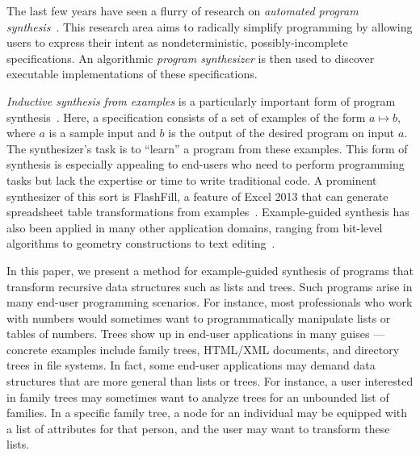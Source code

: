 The last few years have seen a flurry of research on {\em automated
  program
  synthesis}~\cite{sketch06,completefunctional,gulwani-dimensions,sygus,VechevYY13}. This
research area aims to radically simplify programming by allowing
users to express their intent as nondeterministic,
possibly-incomplete specifications.  An algorithmic {\em program
  synthesizer} is then used to discover executable implementations of
these specifications.

{\em Inductive synthesis from
  examples} is a
particularly important form of program synthesis~\cite{gulwani-string,lieberman2001your,kitzelmann2}. Here, a
specification consists of a set of examples of the form $a \mapsto b$,
where $a$ is a sample input and $b$ is the output of the desired
program on input $a$.  The synthesizer's task is to ``learn'' a
program from these examples. This form of synthesis is especially
appealing to end-users who need to perform programming tasks but lack
the expertise or time to write traditional code. A prominent
synthesizer of this sort is FlashFill, a feature of Excel 2013 that
can generate spreadsheet table transformations from
examples~\cite{gulwani-string}. Example-guided synthesis has also been
applied in many other application domains, ranging from bit-level
algorithms to geometry constructions %
to text
editing~\cite{component-based,gulwani-geometry,lieberman2001your}.

In this paper, we present a method for example-guided synthesis of
programs that transform recursive data structures such as lists and trees. Such
programs arise in many end-user programming scenarios. For instance,
most professionals who work with numbers would sometimes want to
programmatically manipulate lists or tables of numbers.  Trees show up
in end-user applications in many guises --- concrete examples include
family trees, HTML/XML documents, and directory trees in file
systems. In fact, some end-user applications may demand data
structures that are more general than lists or trees. For instance, a
user interested in family trees may sometimes want to analyze trees
for an unbounded list of families. In a specific family tree, a node
for an individual may be equipped with a list of attributes for that
person, and the user may want to transform these lists.


